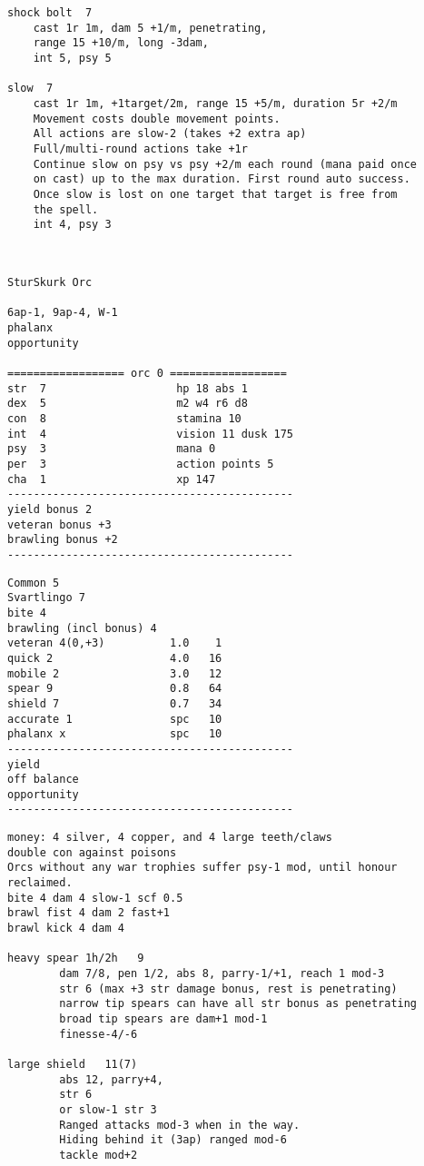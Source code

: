 \begin{verbatim}
shock bolt  7
    cast 1r 1m, dam 5 +1/m, penetrating,
    range 15 +10/m, long -3dam,
    int 5, psy 5

slow  7
    cast 1r 1m, +1target/2m, range 15 +5/m, duration 5r +2/m
    Movement costs double movement points.
    All actions are slow-2 (takes +2 extra ap)
    Full/multi-round actions take +1r
    Continue slow on psy vs psy +2/m each round (mana paid once
    on cast) up to the max duration. First round auto success.
    Once slow is lost on one target that target is free from
    the spell.
    int 4, psy 3



\end{verbatim} \pagebreak[2] \begin{verbatim}
SturSkurk Orc

6ap-1, 9ap-4, W-1
phalanx
opportunity

================== orc 0 ==================
str  7                    hp 18 abs 1
dex  5                    m2 w4 r6 d8
con  8                    stamina 10
int  4                    vision 11 dusk 175
psy  3                    mana 0
per  3                    action points 5
cha  1                    xp 147
--------------------------------------------
yield bonus 2
veteran bonus +3
brawling bonus +2
--------------------------------------------
\end{verbatim} \goodbreak \begin{verbatim}
Common 5
Svartlingo 7
bite 4
brawling (incl bonus) 4
veteran 4(0,+3)          1.0    1
quick 2                  4.0   16
mobile 2                 3.0   12
spear 9                  0.8   64
shield 7                 0.7   34
accurate 1               spc   10
phalanx x                spc   10
--------------------------------------------
yield
off balance
opportunity
--------------------------------------------
\end{verbatim} \goodbreak \begin{verbatim}
money: 4 silver, 4 copper, and 4 large teeth/claws
double con against poisons
Orcs without any war trophies suffer psy-1 mod, until honour reclaimed.
bite 4 dam 4 slow-1 scf 0.5
brawl fist 4 dam 2 fast+1
brawl kick 4 dam 4

heavy spear 1h/2h   9
        dam 7/8, pen 1/2, abs 8, parry-1/+1, reach 1 mod-3
        str 6 (max +3 str damage bonus, rest is penetrating)
        narrow tip spears can have all str bonus as penetrating
        broad tip spears are dam+1 mod-1
        finesse-4/-6

large shield   11(7)
        abs 12, parry+4,
        str 6
        or slow-1 str 3
        Ranged attacks mod-3 when in the way.
        Hiding behind it (3ap) ranged mod-6
        tackle mod+2


\end{verbatim}
